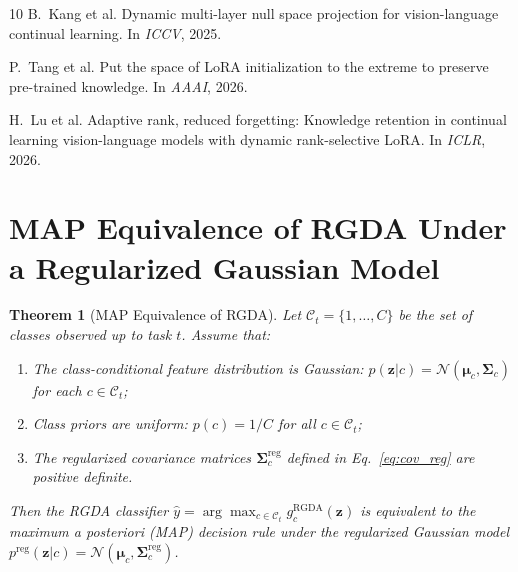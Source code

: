 \documentclass{article}
\newtheorem{theorem}{Theorem}[section]
\begin{document}
\begin{thebibliography}{10}
B.~Kang et al.
\newblock Dynamic multi-layer null space projection for vision-language continual learning.
\newblock In {\em ICCV}, 2025.

P.~Tang et al.
\newblock Put the space of LoRA initialization to the extreme to preserve pre-trained knowledge.
\newblock In {\em AAAI}, 2026.

H.~Lu et al.
\newblock Adaptive rank, reduced forgetting: Knowledge retention in continual learning vision-language models with dynamic rank-selective LoRA.
\newblock In {\em ICLR}, 2026.

\end{thebibliography}

\appendix

\section{MAP Equivalence of RGDA Under a Regularized Gaussian Model}
\label{app:bayes}

\begin{theorem}[MAP Equivalence of RGDA]
\label{thm:bayes}
Let $\mathcal{C}_t = \{1, \ldots, C\}$ be the set of classes observed up to task $t$. Assume that:
\begin{enumerate}[label=(\roman*)]
    \item The class-conditional feature distribution is Gaussian: $p(\mathbf{z}|c) = \mathcal{N}(\boldsymbol{\mu}_c, \mathbf{\Sigma}_c)$ for each $c \in \mathcal{C}_t$;
    \item Class priors are uniform: $p(c) = 1/C$ for all $c \in \mathcal{C}_t$;
    \item The regularized covariance matrices $\mathbf{\Sigma}_c^{\text{reg}}$ defined in Eq.~\eqref{eq:cov_reg} are positive definite.
\end{enumerate}
Then the RGDA classifier $\hat{y} = \arg\max_{c \in \mathcal{C}_t} g_c^{\text{RGDA}}(\mathbf{z})$ is equivalent to the maximum a posteriori (MAP) decision rule under the regularized Gaussian model $p^{\text{reg}}(\mathbf{z}|c) = \mathcal{N}(\boldsymbol{\mu}_c, \mathbf{\Sigma}_c^{\text{reg}})$.
\end{theorem}
\end{document}
